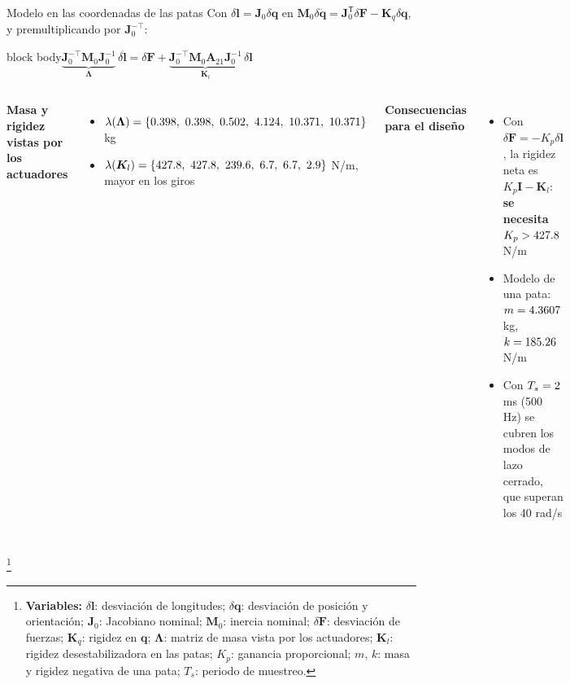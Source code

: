 \documentclass[aspectratio=169,10pt]{beamer}
\newcommand{\vect}[1]{\bm{#1}}
\newcommand{\T}{^{\mathsf{T}}}
\newcommand{\variables}[1]{\begingroup\renewcommand{\thefootnote}{}\footnote[frame]{\textbf{Variables:} #1}\addtocounter{footnote}{-1}\endgroup}
\newcommand{\resultado}[1]{\par\smallskip\begin{beamercolorbox}[rounded=true,sep=0.45em,center]{block body}#1\end{beamercolorbox}\par\smallskip}
\begin{document}
\begin{frame}{Modelo en las coordenadas de las patas}
\small
Con $\delta\vect l = \vect J_0\delta\vect q$ en $\vect M_0\delta\ddot{\vect q} = \vect J_0\T\delta\vect F - \vect K_q\delta\vect q$, y premultiplicando por $\vect J_0^{-\top}$:
\resultado{$\displaystyle \underbrace{\vect J_0^{-\top}\vect M_0\vect J_0^{-1}}_{\vect\Lambda}\,\delta\ddot{\vect l} = \delta\vect F + \underbrace{\vect J_0^{-\top}\vect M_0\vect A_{21}\vect J_0^{-1}}_{\vect K_l}\,\delta\vect l$}
\begin{columns}[T]
\textbf{Masa y rigidez vistas por los actuadores}
\begin{itemize}
\setlength{\itemsep}{0.2em}
\item $\lambda(\vect\Lambda) = \{\LamEigs\}$ kg
\item $\lambda(\vect K_l) = \{\KlEigs\}$ N/m, mayor en los giros
\end{itemize}
\textbf{Consecuencias para el diseño}
\begin{itemize}
\setlength{\itemsep}{0.2em}
\item Con $\delta\vect F = -K_p\delta\vect l$, la rigidez neta es $K_p\vect I - \vect K_l$: \textbf{se necesita} $K_p > 427.8$ N/m
\item Modelo de una pata: $m = 4.3607$ kg, $k = 185.26$ N/m
\item Con $T_s = 2$ ms (500 Hz) se cubren los modos de lazo cerrado, que superan los 40 rad/s
\end{itemize}
\end{columns}
\variables{$\delta\vect l$: desviación de longitudes; $\delta\vect q$: desviación de posición y orientación; $\vect J_0$: Jacobiano nominal; $\vect M_0$: inercia nominal; $\delta\vect F$: desviación de fuerzas; $\vect K_q$: rigidez en $\vect q$; $\vect\Lambda$: matriz de masa vista por los actuadores; $\vect K_l$: rigidez desestabilizadora en las patas; $K_p$: ganancia proporcional; $m$, $k$: masa y rigidez negativa de una pata; $T_s$: periodo de muestreo.}
\end{frame}
\end{document}
